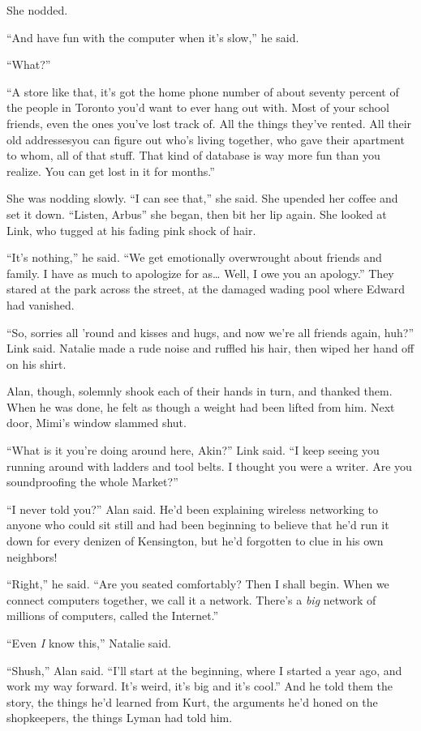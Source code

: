 She nodded.

``And have fun with the computer when it's slow,'' he said.

``What?''

``A store like that, it's got the home phone number of about seventy
percent of the people in Toronto you'd want to ever hang out with. 
Most of your school friends, even the ones you've lost track of.  All
the things they've rented.  All their old addresses\dash{}you can figure
out who's living together, who gave their apartment to whom, all of
that stuff.  That kind of database is way more fun than you realize. 
You can get lost in it for months.''

She was nodding slowly.  ``I can see that,'' she said.  She upended
her coffee and set it down.  ``Listen, Arbus\dash{}'' she began, then bit
her lip again.  She looked at Link, who tugged at his fading pink
shock of hair.

``It's nothing,'' he said.  ``We get emotionally overwrought about
friends and family.  I have as much to apologize for as\ldots{}  Well, I
owe you an apology.'' They stared at the park across the street, at
the damaged wading pool where Edward had vanished.

``So, sorries all 'round and kisses and hugs, and now we're all
friends again, huh?'' Link said.  Natalie made a rude noise and
ruffled his hair, then wiped her hand off on his shirt.

Alan, though, solemnly shook each of their hands in turn, and thanked
them.  When he was done, he felt as though a weight had been lifted
from him.  Next door, Mimi's window slammed shut.

``What is it you're doing around here, Akin?'' Link said.  ``I keep
seeing you running around with ladders and tool belts.  I thought you
were a writer.  Are you soundproofing the whole Market?''

``I never told you?'' Alan said.  He'd been explaining wireless
networking to anyone who could sit still and had been beginning to
believe that he'd run it down for every denizen of Kensington, but
he'd forgotten to clue in his own neighbors!

``Right,'' he said.  ``Are you seated comfortably?  Then I shall
begin.  When we connect computers together, we call it a network. 
There's a \textit{big} network of millions of computers, called the
Internet.''

``Even \textit{I} know this,'' Natalie said.

``Shush,'' Alan said.  ``I'll start at the beginning, where I started
a year ago, and work my way forward.  It's weird, it's big and it's
cool.'' And he told them the story, the things he'd learned from Kurt,
the arguments he'd honed on the shopkeepers, the things Lyman had told
him.

